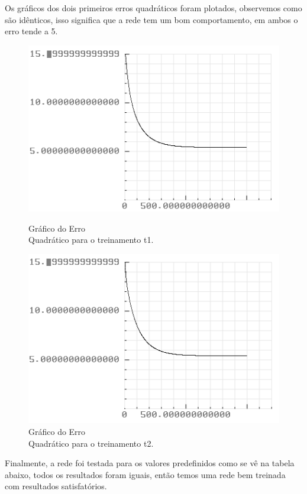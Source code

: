 Os gráficos dos dois primeiros erros quadráticos foram plotados, observemos como são idênticos, isso significa que a rede tem um bom comportamento, em ambos o erro tende a 5.


\begin{figure}[!htb]
	\centering
	\begin{minipage}{0.5\textwidth}
		\centering
		\includegraphics[scale = 0.5]{imagens/G1}
		\caption{Gráfico do Erro\\ Quadrático para o treinamento t1.}
		\label{fig:prob1_6_2}
	\end{minipage}%
	\begin{minipage}{0.5\textwidth}
		\centering
		\includegraphics[scale = 0.5]{imagens/G2}
		\caption{Gráfico do Erro\\ Quadrático para o treinamento t2.}
		\label{fig:prob1_6_1}
	\end{minipage}
\end{figure}

Finalmente, a rede foi testada para os valores predefinidos como se vê na tabela abaixo, todos os resultados foram iguais, então temos uma rede bem treinada com resultados satisfatórios.

